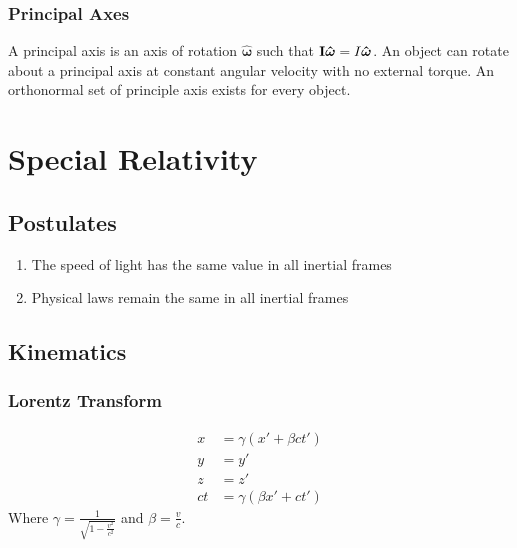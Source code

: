 \documentclass[11pt, letterpaper]{article}
\newcommand{\uve}[1]{
  \ensuremath{\bm{\hat{#1}}}}          %
\newcommand{\tensor}[1]{
  \ensuremath{\text{\bf{#1}}}}         %
\begin{document}
\begin{multicols*}{3}
\subsubsection{Principal Axes}
A principal axis is an axis of rotation $\uve{\omega}$ such that $\tensor{I}\uve{\omega} = I\uve{\omega}$. An object can rotate about a principal axis at constant angular velocity with no external torque. An orthonormal set of principle axis exists for every object.

\section{Special Relativity}
\subsection{Postulates}
\begin{enumerate}
\item The speed of light has the same value in all inertial frames
\item Physical laws remain the same in all inertial frames
\end{enumerate}
\subsection{Kinematics}
\subsubsection{Lorentz Transform}
\begin{align*}
  x&= \gamma (x' + \beta ct') \\
  y&=y' \\
  z&=z' \\
  ct&= \gamma (\beta x' + ct')
\end{align*}
Where $\gamma = \frac{1}{\sqrt{1-\frac{v^2}{c^2}}}$ and $\beta = \frac{v}{c}$.

\end{multicols*}
\end{document}
